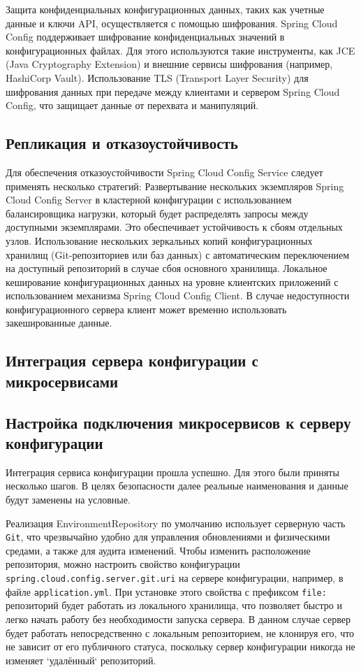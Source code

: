 Защита конфиденциальных конфигурационных данных, таких как учетные данные и ключи API, осуществляется с помощью
шифрования.
Spring Cloud Config поддерживает шифрование конфиденциальных значений в конфигурационных файлах.
Для этого используются
такие инструменты, как JCE (Java Cryptography Extension) и внешние сервисы шифрования (например, HashiCorp Vault).
Использование TLS (Transport Layer Security) для шифрования данных при передаче между клиентами и сервером Spring Cloud
Config, что защищает данные от перехвата и манипуляций.

\subsection{Репликация и отказоустойчивость}

Для обеспечения отказоустойчивости Spring Cloud Config Service следует применять несколько стратегий:
Развертывание нескольких экземпляров Spring Cloud Config Server в кластерной конфигурации с использованием
балансировщика нагрузки, который будет распределять запросы между доступными
экземплярами.
Это обеспечивает устойчивость к сбоям отдельных узлов.
Использование нескольких зеркальных копий конфигурационных хранилищ (Git-репозиториев или баз данных) с автоматическим
переключением на доступный репозиторий в случае сбоя основного хранилища.
Локальное кеширование конфигурационных данных на уровне клиентских приложений с использованием механизма Spring Cloud
Config Client.
В случае недоступности конфигурационного сервера клиент может временно использовать закешированные
данные.

\subsection{Интеграция сервера конфигурации с микросервисами}

\subsection{Настройка подключения микросервисов к серверу конфигурации}

Интеграция сервиса конфигурации прошла успешно.
Для этого были приняты несколько шагов.
В целях безопасности далее реальные наименования и данные будут заменены на условные.

Реализация EnvironmentRepository по умолчанию использует серверную часть \texttt{Git}, что чрезвычайно удобно для управления обновлениями и физическими средами, а также для аудита изменений.
Чтобы изменить расположение репозитория, можно настроить свойство конфигурации \texttt{spring.cloud.config.server.git.uri} на сервере конфигурации, например, в файле \texttt{application.yml}.
При установке этого свойства с префиксом \texttt{file:} репозиторий будет работать из локального хранилища, что позволяет быстро и легко начать работу без необходимости запуска сервера.
В данном случае сервер будет работать непосредственно с локальным репозиторием, не клонируя его, что не зависит от его публичного статуса, поскольку сервер конфигурации никогда не изменяет `удалённый` репозиторий.

